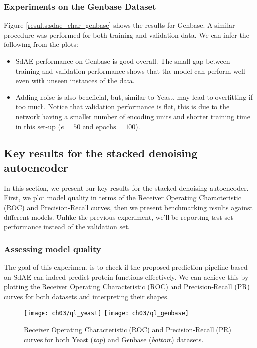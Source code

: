 \subsubsection{Experiments on the Genbase Dataset}

Figure \ref{results:sdae_char_genbase} shows the results for Genbase. A similar
procedure was performed for both training and validation data. We can infer
the following from the plots:

\begin{itemize}
  \item SdAE performance on Genbase is good overall. The small gap between
  training and validation performance shows that the model can perform well even
  with unseen instances of the data.
  \item Adding noise is also beneficial, but, similar to Yeast, may lead to
  overfitting if too much. Notice that validation performance is flat, this
  is due to the network having a smaller number of encoding units and shorter
  training time in this set-up ($e=50$ and $\text{epochs}=100$).
\end{itemize}

\subsection{Key results for the stacked denoising autoencoder}

In this section, we present our key results for the stacked denoising
autoencoder. First, we plot model quality in terms of the Receiver Operating
Characteristic (ROC) and Precision-Recall curves, then we present
benchmarking results against different models. Unlike the previous
experiment, we'll be reporting test set performance instead of the validation
set.

\subsubsection{Assessing model quality}

\par The goal of this experiment is to check if the proposed prediction
pipeline based on SdAE can indeed predict protein functions effectively. We
can achieve this by plotting the Receiver Operating Characteristic (ROC) and
Precision-Recall (PR) curves for both datasets and interpreting their shapes. 

\begin{figure}[!h]
  \centering
  \texttt{[image: ch03/ql\_yeast]}
  \texttt{[image: ch03/ql\_genbase]}
  \caption[Receiver Operating Characteristic (ROC) and Precision-Recall (PR)
  curves for the two protein benchmarks]{
    Receiver Operating Characteristic (ROC) and Precision-Recall (PR) curves
    for both Yeast (\textit{top}) and Genbase (\textit{bottom}) datasets.
  }
  \label{results:sdae_quality}
\end{figure}


